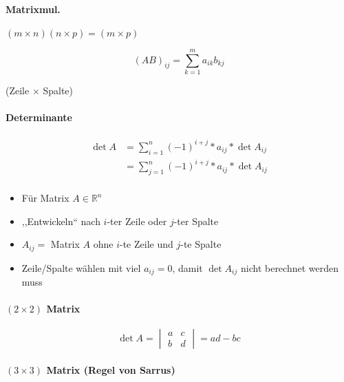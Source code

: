 \paragraph{Matrixmul.}
$(m \times n)(n \times p) = (m \times p)$

\begin{mzImportant}
  $$(AB)_{ij} = \sum_{k=1}^m a_{ik}b_{kj}$$

  (Zeile $\times$ Spalte)
\end{mzImportant}

\paragraph{Determinante}

\begin{align*}
  \det A & = \sum_{i=1}^n (-1)^{i + j} * a_{ij} * \det A_{ij} \\
         & = \sum_{j=1}^n (-1)^{i + j} * a_{ij} * \det A_{ij} \\
\end{align*}

\begin{itemize}
  \item Für Matrix $A \in \mathbb{R}^n$
  \item ,,Entwickeln`` nach $i$-ter Zeile oder $j$-ter Spalte
  \item $A_{ij} =$ Matrix $A$ ohne $i$-te Zeile und $j$-te Spalte
  \item Zeile/Spalte wählen mit viel $a_{ij} = 0$, damit $\det A_{ij}$ nicht berechnet werden muss
\end{itemize}

\paragraph{$(2 \times 2)$ Matrix}

$$\det A = \begin{vmatrix}
    a & c \\
    b & d
  \end{vmatrix} = ad - bc$$

\paragraph{$(3 \times 3)$ Matrix (Regel von Sarrus)}

